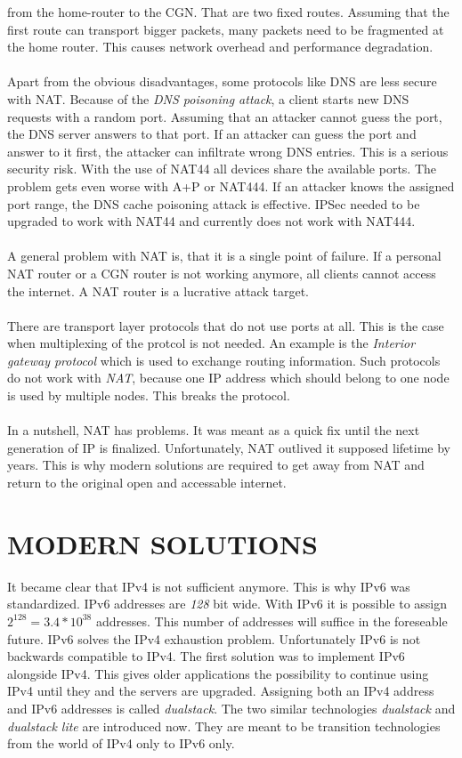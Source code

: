 \documentclass[format=sigconf, natbib=true, nonacm=true]{acmart}
\begin{document}
from the home-router to the CGN. That are two fixed routes. Assuming that the first route can transport bigger packets, many packets need to be fragmented at the home router. This causes network overhead and performance degradation.\\\\Apart from the obvious disadvantages, some protocols like DNS are less secure with NAT. Because of the \textit{DNS poisoning attack}, a client starts new DNS requests with a random port. Assuming that an attacker cannot guess the port, the DNS server answers to that port. If an attacker can guess the port and answer to it first, the attacker can infiltrate wrong DNS entries. This is a serious security risk. With the use of NAT44 all devices share the available ports. The problem gets even worse with A+P or NAT444. If an attacker knows the assigned port range, the DNS cache poisoning attack is effective. IPSec needed to be upgraded to work with NAT44 and currently does not work with NAT444\cite{Hughes2022_C04}.\\\\A general problem with NAT is, that it is a single point of failure. If a personal NAT router or a CGN router is not working anymore, all clients cannot access the internet. A NAT router is a lucrative attack target\cite{Hughes2022_C04}.\\\\There are transport layer protocols that do not use ports at all. This is the case when multiplexing of the protcol is not needed. An example is the \textit{Interior gateway protocol} which is used to exchange routing information. Such protocols do not work with \textit{NAT}, because one IP address which should belong to one node is used by multiple nodes. This breaks the protocol.\\\\In a nutshell, NAT has problems. It was meant as a quick fix until the next generation of IP is finalized. Unfortunately, NAT outlived it supposed lifetime by years. This is why modern solutions are required to get away from NAT and return to the original open and accessable internet.
    \section{MODERN SOLUTIONS}
    It became clear that IPv4 is not sufficient anymore. This is why IPv6 was standardized. IPv6 addresses are \textit{128} bit wide. With IPv6 it is possible to assign $2^{128}=3.4*10^{38}$ addresses. This number of addresses will suffice in the foreseable future. IPv6 solves the IPv4 exhaustion problem. Unfortunately IPv6 is not backwards compatible to IPv4. The first solution was to implement IPv6 alongside IPv4. This gives older applications the possibility to continue using IPv4 until they and the servers are upgraded. Assigning both an IPv4 address and IPv6 addresses is called \textit{dualstack}. The two similar technologies \textit{dualstack} and \textit{dualstack lite} are introduced now. They are meant to be transition technologies from the world of IPv4 only to IPv6 only.
\end{document}
